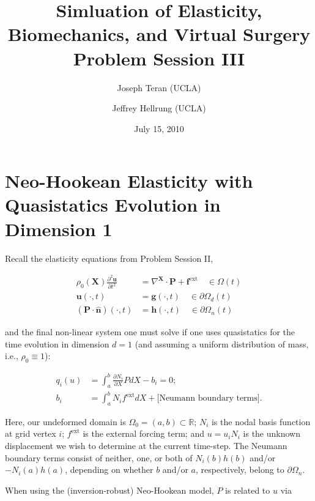 \documentclass{article}
\title{Simluation of Elasticity, Biomechanics, and Virtual Surgery \\
       Problem Session III}
\date{July 15, 2010}
\author{Joseph Teran (UCLA) \and
        Jeffrey Hellrung (UCLA)}
\begin{document}
\maketitle

\section{Neo-Hookean Elasticity with Quasistatics Evolution in Dimension 1}

Recall the elasticity equations from Problem Session II,

\begin{subequations}
\begin{align}
\rho_0( \mathbf{X} ) \frac{\partial^2 \mathbf{u}}{\partial t^2} & = \nabla^{\mathbf{X}} \cdot \mathbf{P} + \mathbf{f}^{\text{ext}} \quad \in \Omega(t) \\
\mathbf{u}(\cdot,t) & = \mathbf{g}(\cdot,t) \quad \in \partial \Omega_d(t) \\
\left( \mathbf{P} \cdot \mathbf{\hat{n}} \right) (\cdot,t) & = \mathbf{h}(\cdot,t) \quad \in \partial \Omega_n(t)
\end{align}
\end{subequations}

and the final non-linear system one must solve if one uses quasistatics for the time evolution in dimension \(d = 1\) (and assuming a uniform distribution of mass, i.e., \(\rho_0 \equiv 1\)):

\begin{subequations}\label{nonlinear1d}
\begin{align}
q_i(u) & = \int_a^b \frac{\partial N_i}{\partial X} P dX - b_i = 0; \label{qi} \\
b_i & = \int_a^b N_i f^{\text{ext}} dX + \text{[Neumann boundary terms]}. \label{bi}
\end{align}
\end{subequations}

Here, our undeformed domain is \(\Omega_0 = (a,b) \subset \mathbb{R}\); \(N_i\) is the nodal basis function at grid vertex \(i\); \(f^{\text{ext}}\) is the external forcing term; and \(u = u_i N_i\) is the unknown displacement we wish to determine at the current time-step.  The Neumann boundary terms consist of neither, one, or both of \(N_i(b) h(b)\) and/or \(-N_i(a) h(a)\), depending on whether \(b\) and/or \(a\), respectively, belong to \(\partial \Omega_n\).

When using the (inversion-robust) Neo-Hookean model, \(P\) is related to \(u\) via
\end{document}
